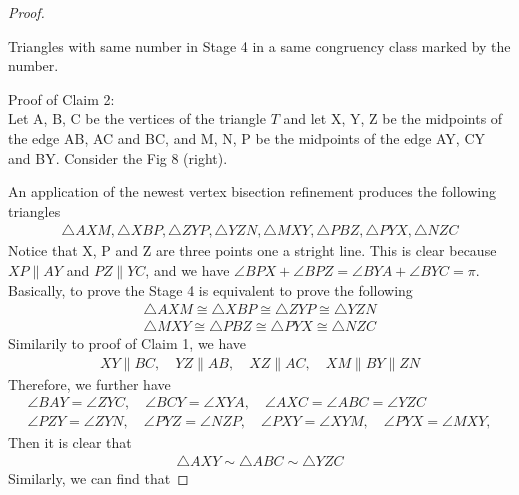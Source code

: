 \begin{proof}

    \begin{claim}
    Triangles with same number in Stage 4 in a same congruency class marked by the number.
    \end{claim}
    \noindent
    Proof of Claim 2: \\
    Let A, B, C be the vertices of the triangle $T$ and let X, Y, Z be the midpoints of the edge AB, AC and BC, and M, N, P be the midpoints of the edge AY, CY and BY. Consider the Fig 8 (right).
 
    An application of the newest vertex bisection refinement produces the following triangles
    \begin{align*}
    \triangle{AXM}, \triangle{XBP}, \triangle{ZYP}, \triangle{YZN}, \triangle{MXY}, \triangle{PBZ}, \triangle{PYX}, \triangle{NZC}
    \end{align*}
    Notice that X, P and Z are three points one a stright line. This is clear because $XP\parallel AY$ and $PZ\parallel YC$, and we have $\angle{BPX}+\angle{BPZ} = \angle{BYA}+\angle{BYC} = \pi$. Basically, to prove the Stage 4 is equivalent to prove the following
    \begin{align*}
    \triangle{AXM}\cong\triangle{XBP}\cong\triangle{ZYP}\cong\triangle{YZN}\\
    \triangle{MXY}\cong\triangle{PBZ}\cong\triangle{PYX}\cong\triangle{NZC}
    \end{align*}
    Similarily to proof of Claim 1, we have
    \begin{align*}
    XY\parallel BC,
    \quad
    YZ\parallel AB,
    \quad
    XZ\parallel AC,
    \quad
    XM\parallel BY\parallel ZN
    \end{align*}
    Therefore, we further have 
    \begin{align*}
    \angle{BAY} = \angle{ZYC},
    \quad
    \angle{BCY} = \angle{XYA},
    \quad
    \angle{AXC} = \angle{ABC} = \angle{YZC}\\
    \angle{PZY} = \angle{ZYN},
    \quad
    \angle{PYZ} = \angle{NZP},
    \quad
    \angle{PXY} = \angle{XYM},
    \quad
    \angle{PYX} = \angle{MXY},
    \end{align*}
    Then it is clear that
    \begin{align*}
    \triangle{AXY} \sim \triangle{ABC} \sim \triangle{YZC}
    \end{align*}
    Similarly, we can find that 

\end{proof}
